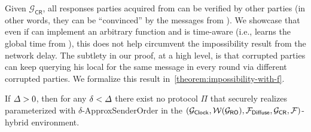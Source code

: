 

Given $\mathcal{G}_{\mathsf{CR}}$, all responses parties acquired from \F can be verified by other parties (in other words, they can be ``convinced'' by the messages from \F).
%
We showcase that even if \F can implement an arbitrary function and is time-aware (i.e., \F learns the global time from \funcClock), this does not help circumvent the impossibility result from the network delay.
%
The subtlety in our proof, at a high level, is that corrupted parties can keep querying his local \F for the same message in every round via different corrupted parties.
%
We formalize this result in~\cref{theorem:impossibility-with-f}.

\begin{theorem}
	\label{theorem:impossibility-with-f}
	
	If $\varDelta > 0$, then for any $\delta < \varDelta$ there exist no protocol $\Pi$ that securely realizes \funcFairLedger parameterized with $\delta$-\textsf{ApproxSenderOrder} in the $(\mathcal{G}_{\mathsf{Clock}}, \mathcal{W}(\mathcal{G}_{\mathsf{RO}}), \mathcal{F}_{\mathsf{Diffuse}},\allowbreak \mathcal{G}_{\mathsf{CR}}, \mathcal{F})$-hybrid environment.
\end{theorem}

